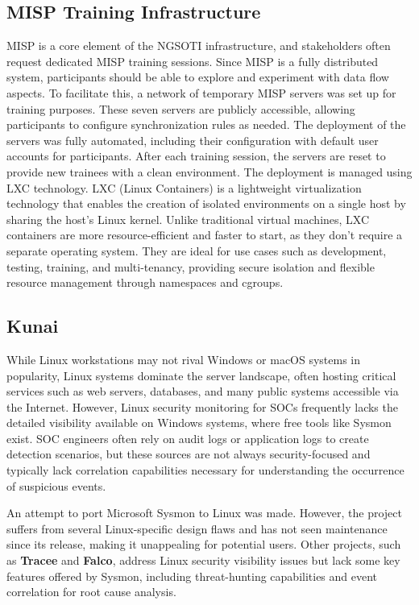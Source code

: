 \subsection{MISP Training Infrastructure}
MISP is a core element of the NGSOTI infrastructure, and stakeholders often request dedicated MISP training sessions. Since MISP is a fully distributed system, participants should be able to explore and experiment with data flow aspects. To facilitate this, a network of temporary MISP servers was set up for training purposes. These seven servers are publicly accessible, allowing participants to configure synchronization rules as needed. The deployment of the servers was fully automated, including their configuration with default user accounts for participants. After each training session, the servers are reset to provide new trainees with a clean environment. The deployment is managed using LXC technology. LXC (Linux Containers) is a lightweight virtualization technology that enables the creation of isolated environments on a single host by sharing the host's Linux kernel. Unlike traditional virtual machines, LXC containers are more resource-efficient and faster to start, as they don't require a separate operating system. They are ideal for use cases such as development, testing, training, and multi-tenancy, providing secure isolation and flexible resource management through namespaces and cgroups.


\subsection{Kunai}

While Linux workstations may not rival Windows or macOS systems in popularity, Linux systems dominate the server landscape, often hosting critical services such as web servers, databases, and many public systems accessible via the Internet. However, Linux security monitoring for SOCs frequently lacks the detailed visibility available on Windows systems, where free tools like Sysmon\cite{sysmon_tool} exist. SOC engineers often rely on audit logs or application logs to create detection scenarios, but these sources are not always security-focused and typically lack correlation capabilities necessary for understanding the occurrence of suspicious events.

An attempt to port Microsoft Sysmon to Linux was made\cite{sysmon_linux}.
However, the project suffers from several Linux-specific design flaws and has
not seen maintenance since its release, making it unappealing for potential
users. Other projects, such as
\textbf{Tracee}\cite{tracee_aquasecurity}
and \textbf{Falco}\cite{falco_falcosecurity},
address Linux security visibility issues but lack some key features offered by Sysmon,
including threat-hunting capabilities and event correlation for root cause analysis.

